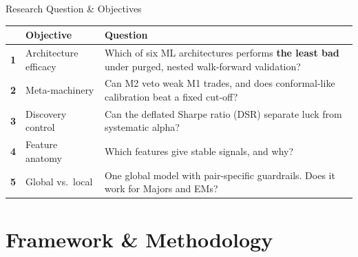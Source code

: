 \documentclass[aspectratio=169, 11pt]{beamer}
\newcommand{\hl}[1]{\textcolor{unibored}{\textbf{#1}}}
\begin{document}
\begin{frame}{Research Question \& Objectives}
  \begin{center}
  \end{center}
  \vspace{1mm}
  \small
  \begin{tabular}{@{}p{}p{}p{}@{}}
    \toprule
    & \textbf{Objective} & \textbf{Question} \\
    \midrule
    \hl{1} & Architecture efficacy & Which of six ML architectures performs \hl{the least bad} under purged, nested walk-forward validation? \\
    \hl{2} & Meta-machinery & Can M2 veto weak M1 trades, and does conformal-like calibration beat a fixed cut-off? \\
    \hl{3} & Discovery control & Can the deflated Sharpe ratio (DSR) separate luck from systematic alpha? \\
    \hl{4} & Feature anatomy & Which features give stable signals, and why? \\
    \hl{5} & Global vs.\ local & One global model with pair-specific guardrails. Does it work for Majors and EMs? \\
    \bottomrule
  \end{tabular}
\end{frame}

\section{Framework \& Methodology}
\end{document}
